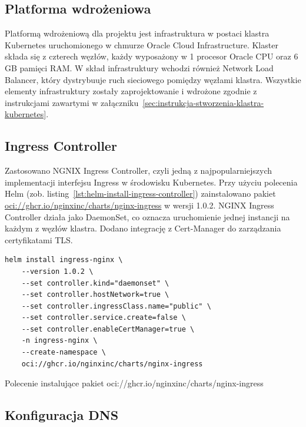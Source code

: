 \subsection{Platforma wdrożeniowa}\label{subsec:platforma-wdrozeniowa-kubernetes}

Platformą wdrożeniową dla projektu jest infrastruktura w postaci klastra Kubernetes uruchomionego w chmurze Oracle Cloud Infrastructure.
Klaster składa się z czterech węzłów, każdy wyposażony w 1 procesor Oracle CPU oraz 6 GB pamięci RAM\@.
W skład infrastruktury wchodzi również Network Load Balancer, który dystrybuuje ruch sieciowego pomiędzy węzłami klastra.
Wszystkie elementy infrastruktury zostały zaprojektowanie i wdrożone zgodnie z instrukcjami zawartymi w załączniku~\ref{sec:instrukcja-stworzenia-klastra-kubernetes}.

\subsection{Ingress Controller}\label{subsec:ingress-controller}

Zastosowano NGNIX Ingress Controller, czyli jedną z najpopularniejszych implementacji interfejsu Ingress w środowisku Kubernetes.
Przy użyciu polecenia Helm (zob. listing~\ref{lst:helm-install-ingress-controller}) zainstalowano pakiet \url{oci://ghcr.io/nginxinc/charts/nginx-ingress} w wersji 1.0.2.
NGINX Ingress Controller działa jako DaemonSet, co oznacza uruchomienie jednej instancji na każdym z węzłów klastra.
Dodano integrację z Cert-Manager do zarządzania certyfikatami TLS\@.

\begin{listing}[H]
    \begin{verbatim}
helm install ingress-nginx \
    --version 1.0.2 \
    --set controller.kind="daemonset" \
    --set controller.hostNetwork=true \
    --set controller.ingressClass.name="public" \
    --set controller.service.create=false \
    --set controller.enableCertManager=true \
    -n ingress-nginx \
    --create-namespace \
    oci://ghcr.io/nginxinc/charts/nginx-ingress
    \end{verbatim}
    \caption{Polecenie instalujące pakiet oci://ghcr.io/nginxinc/charts/nginx-ingress}
    \label{lst:helm-install-ingress-controller}
\end{listing}

\newpage

\subsection{Konfiguracja DNS}\label{subsec:konfiguracja-dns}

